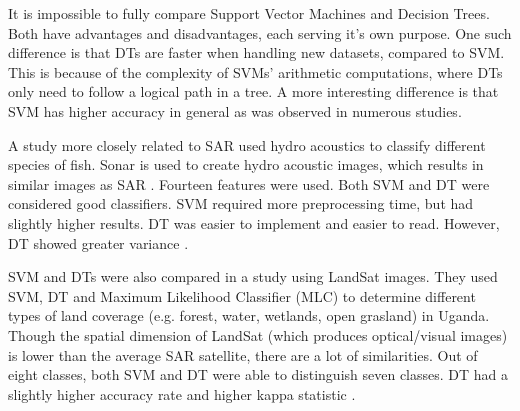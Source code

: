 It is impossible to fully compare Support Vector Machines and Decision Trees. Both have advantages and disadvantages, each serving it's own purpose. One such difference is that DTs are faster when handling new datasets, compared to SVM. This is because of the complexity of SVMs' arithmetic computations, where DTs only need to follow a logical path in a tree. A more interesting difference is that SVM has higher accuracy in general as was observed in numerous studies\cite{arun2010hybrid}.
 
A study more closely related to SAR used hydro acoustics to classify different species of fish. Sonar is used to create hydro acoustic images, which results in similar images as SAR \cite{griffiths2003synthetic}. Fourteen features were used. Both SVM and DT were considered good classifiers. SVM required more preprocessing time, but had slightly higher results. DT was easier to implement and easier to read. However, DT showed greater variance \cite{Robotham2011170}.

SVM and DTs were also compared in a study using LandSat images. They used SVM, DT and Maximum Likelihood Classifier (MLC) to determine different types of land coverage (e.g. forest, water, wetlands, open grasland) in Uganda. Though the spatial dimension of LandSat (which produces optical/visual images) is lower than the average SAR satellite, there are a lot of similarities. Out of eight classes, both SVM and DT were able to distinguish seven classes. DT had a slightly higher accuracy rate and higher kappa statistic \cite{Otukei2010S27}.



